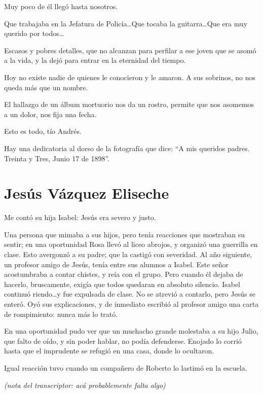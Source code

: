 \documentclass[a4paper]{article}
\begin{document}
Muy poco de él llegó hasta nosotros.

Que trabajaba en la Jefatura de Policía\ldots Que tocaba la guitarra\ldots Que era muy querido por todos\ldots

Escasos y pobres detalles, que no alcanzan para perfilar a ese joven que se asomó a la vida, y la dejó para entrar en la eternidad del tiempo.

Hoy no existe nadie de quienes le conocieron y le amaron. A sus sobrinos, no nos queda más que un nombre.

El hallazgo de un álbum mortuorio nos da un rostro, permite que nos asomemos a un dolor, nos fija una fecha.

Esto es todo, tío Andrés.

Hay una dedicatoria al dorso de la fotografía que dice: ``A mis queridos padres. Treinta y Tres, Junio 17 de 1898''.

\section{Jesús Vázquez Eliseche}

Me contó su hija Isabel: Jesús era severo y justo.\ 

Una persona que mimaba a sus hijos, pero tenía reacciones que mostraban su sentir; en una oportunidad Rosa llevó al liceo abrojos, y organizó una guerrilla en clase. Esto avergonzó a su padre; que la castigó con severidad. Al año siguiente, un profesor amigo de Jesús, tenía entre sus alumnos a Isabel. Este señor acostumbraba a contar chistes, y reía con el grupo. Pero cuando él dejaba de hacerlo, bruscamente, exigía que todos quedaran en absoluto silencio. Isabel continuó riendo\ldots y fue expulsada de clase. No se atrevió a contarlo, pero Jesús se enteró. Oyó sus explicaciones, y de inmediato escribió al profesor amigo una carta de rompimiento: nunca más lo trató.

\bigbreak{}

En una oportunidad pudo ver que un muchacho grande molestaba a su hijo Julio, que falto de oído, y sin poder hablar, no podía defenderse. Enojado lo corrió hasta que el imprudente se refugió en una casa, donde lo ocultaron.

Igual reacción tuvo cuando un compañero de Roberto lo lastimó en la escuela.

\bigbreak{}

\emph{(nota del transcriptor: acá probablemente falta algo)}

\bigbreak{}
\end{document}
